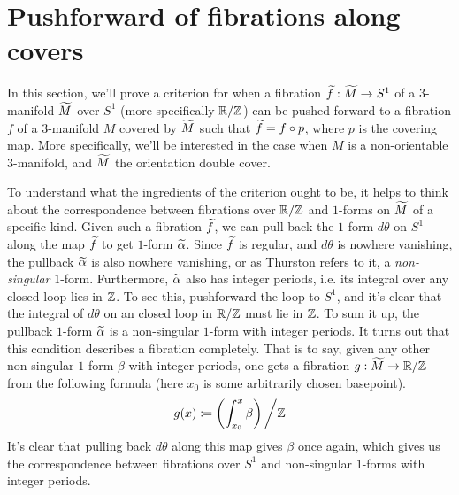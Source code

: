 \section{Pushforward of fibrations along covers}
\label{sec:pushf-fibr-along}

In this section, we'll prove a criterion for when a fibration $\widetilde{f}: \widetilde{M} \to S^1$ of a
$3$-manifold $\widetilde{M}$ over $S^1$ (more specifically $\mathbb{R}/\mathbb{Z}$) can be pushed forward to a fibration
$f$ of a $3$-manifold $M$ covered by $\widetilde{M}$ such that $\widetilde{f} = f \circ p$, where $p$ is the
covering map. More specifically, we'll be interested in the case when $M$ is a non-orientable $3$-manifold,
and $\widetilde{M}$ the orientation double cover.

To understand what the ingredients of the criterion ought to be, it helps to think about the
correspondence between fibrations over $\mathbb{R}/\mathbb{Z}$ and $1$-forms on $\widetilde{M}$ of a specific kind. Given
such a fibration $\widetilde{f}$, we can pull back the $1$-form $d\theta$ on $S^1$ along the map $\widetilde{f}$
to get $1$-form $\widetilde{\alpha}$. Since $\widetilde{f}$ is regular, and $d\theta$ is nowhere vanishing, the
pullback $\widetilde{\alpha}$ is also nowhere vanishing, or as Thurston refers to it, a \emph{non-singular}
$1$-form. Furthermore, $\widetilde{\alpha}$ also has integer periods, i.e. its integral over any closed
loop lies in $\mathbb{Z}$. To see this, pushforward the loop to $S^1$, and it's clear that the integral of
$d\theta$ on an closed loop in $\mathbb{R}/\mathbb{Z}$ must lie in $\mathbb{Z}$. To sum it up, the pullback $1$-form
$\widetilde{\alpha}$ is a non-singular $1$-form with integer periods. It turns out that this condition
describes a fibration completely. That is to say, given any other non-singular $1$-form $\beta$ with
integer periods, one gets a fibration $g: \widetilde{M} \to \mathbb{R}/\mathbb{Z}$ from the following formula (here $x_0$
is some arbitrarily chosen basepoint).
\begin{align*}
  g(x) \coloneqq \left( \int_{x_0}^x \beta \right) \bigg/ \mathbb{Z}
\end{align*}
It's clear that pulling back $d\theta$ along this map gives $\beta$ once again, which gives us the
correspondence between fibrations over $S^1$ and non-singular $1$-forms with integer periods.


